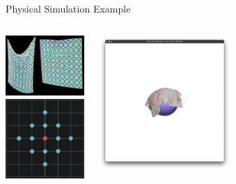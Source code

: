 \begin{frame}{Physical Simulation Example}
\begin{columns}
  \begin{center}
    \includegraphics[width=3cm]{cloth_mesh.png}\\
    \vspace{0.5cm}
    \includegraphics[width=3cm]{spring_stencil.png}
  \end{center}

  \centering
  \begin{center}
    \includegraphics[width=5cm]{cloth_example.png}
  \end{center}
\end{columns}
\end{frame}




